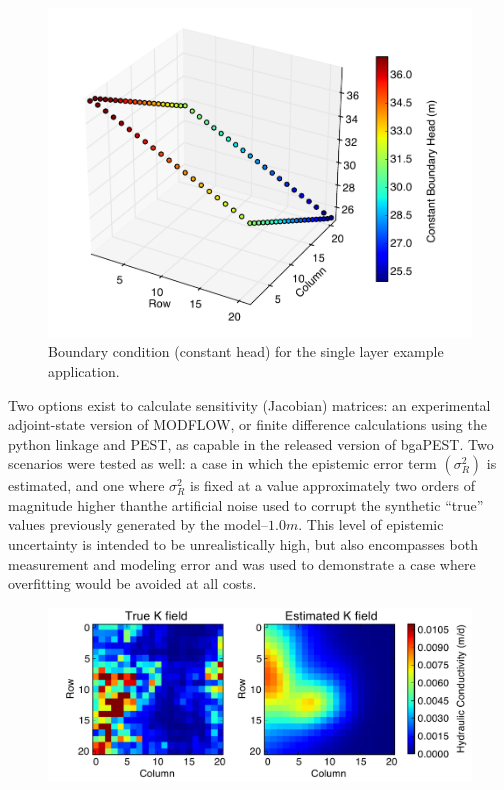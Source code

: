 \documentclass[11pt,oneside,onecolumn]{usgsreport}
\begin{document}
\begin{appendix}
\begin{figure}[H]
\begin{center}\includegraphics[scale=0.5]{figures/starting_heads}\end{center}

\caption{\label{fig:stheads1L}Boundary condition (constant head) for the single
layer example application.}
\end{figure}


Two options exist to calculate sensitivity (Jacobian) matrices: an
experimental adjoint-state version of MODFLOW, or finite difference
calculations using the python linkage and PEST, as capable in the
released version of bgaPEST. Two scenarios were tested as well: a
case in which the epistemic error term $\left(\sigma_{R}^{2}\right)$
is estimated, and one where $\sigma_{R}^{2}$ is fixed at a value
approximately two orders of magnitude higher thanthe artificial noise
used to corrupt the synthetic ``true'' values previously generated
by the model--$1.0m$. This level of epistemic uncertainty is intended
to be unrealistically high, but also encompasses both measurement
and modeling error and was used to demonstrate a case where overfitting
would be avoided at all costs.

\begin{figure}[H]
\begin{center} \includegraphics[scale=0.7]{figures/1_lay_best_pars_sigma_fixed}\end{center}


\end{figure}
\end{appendix}
\end{document}
